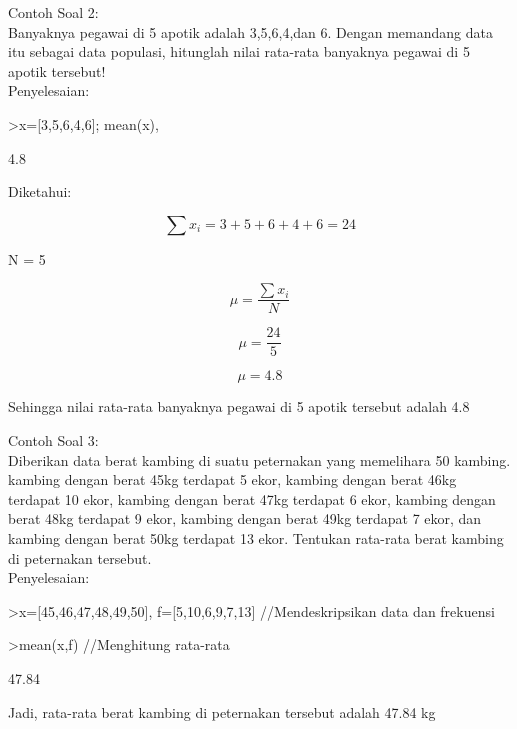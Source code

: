 \documentclass[a4paper,10pt]{article}
\begin{document}
\begin{eulernotebook}
\begin{eulercomment}
Contoh Soal 2:\\
Banyaknya pegawai di 5 apotik adalah 3,5,6,4,dan 6. Dengan memandang
data itu sebagai data populasi, hitunglah nilai rata-rata banyaknya
pegawai di 5 apotik tersebut!\\
Penyelesaian:
\end{eulercomment}
\begin{eulerprompt}
>x=[3,5,6,4,6]; mean(x),
\end{eulerprompt}
\begin{euleroutput}
  4.8
\end{euleroutput}
\begin{eulercomment}
Diketahui:\\
\end{eulercomment}
\begin{eulerformula}
\[
\sum x_i={3+5+6+4+6}=24
\]
\end{eulerformula}
\begin{eulerttcomment}
                        N = 5
\end{eulerttcomment}
\begin{eulerformula}
\[
\mu = \frac{\sum x_i}{N}
\]
\end{eulerformula}
\begin{eulerformula}
\[
\mu = \frac{24}{5}
\]
\end{eulerformula}
\begin{eulerformula}
\[
\mu = 4.8
\]
\end{eulerformula}
\begin{eulercomment}
Sehingga nilai rata-rata banyaknya pegawai di 5 apotik tersebut adalah
4.8

Contoh Soal 3:\\
Diberikan data berat kambing di suatu peternakan yang memelihara 50
kambing. kambing dengan berat 45kg terdapat 5 ekor, kambing dengan
berat 46kg terdapat 10 ekor, kambing dengan berat 47kg terdapat 6
ekor, kambing dengan berat 48kg terdapat 9 ekor, kambing dengan berat
49kg terdapat 7 ekor, dan kambing dengan berat 50kg terdapat 13 ekor.
Tentukan rata-rata berat kambing di peternakan tersebut.\\
Penyelesaian:
\end{eulercomment}
\begin{eulerprompt}
>x=[45,46,47,48,49,50], f=[5,10,6,9,7,13]      //Mendeskripsikan data dan frekuensi
\end{eulerprompt}
\begin{euleroutput}
  [45,  46,  47,  48,  49,  50]
  [5,  10,  6,  9,  7,  13]
\end{euleroutput}
\begin{eulerprompt}
>mean(x,f)    //Menghitung rata-rata  
\end{eulerprompt}
\begin{euleroutput}
  47.84
\end{euleroutput}
\begin{eulercomment}
Jadi, rata-rata berat kambing di peternakan tersebut adalah 47.84 kg
\end{eulercomment}
\begin{eulercomment}



\end{eulercomment}
\end{eulernotebook}
\end{document}
